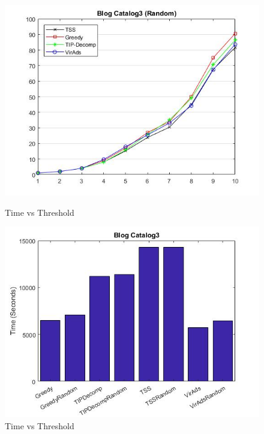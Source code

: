 \begin{figure}[h!]
\begin{minipage}[t]{0.50\textwidth}
\includegraphics[width=\linewidth,keepaspectratio=true]{images/bc3resultrandom.jpg}
\caption{Time vs Threshold}

\end{minipage}
\begin{minipage}[t]{0.50\textwidth}
\includegraphics[width=\linewidth,keepaspectratio=true]{images/bc3time1.jpg}
\caption{Time vs Threshold}
\end{minipage}
\end{figure}

